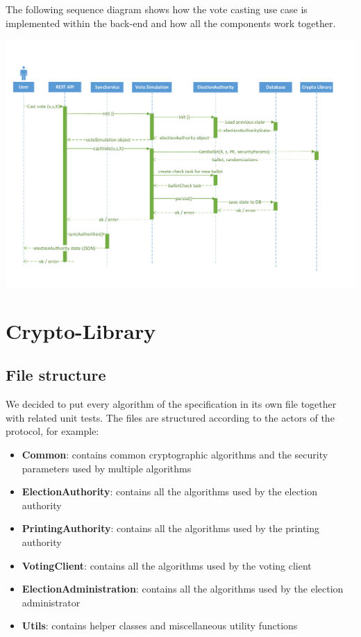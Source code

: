 The following sequence diagram shows how the vote casting use case is implemented within the back-end and how all the components work together.

\begin{center}
\includegraphics[scale=0.62]{assets/votecastingDiagram.pdf}
\label{Vote casting sequence diagram}%
\end{center}

\section{Crypto-Library}

\subsection{File structure}
We decided to put every algorithm of the specification in its own file together with related unit tests. The files are structured according to the actors of the protocol, for example:

\begin{itemize}
	\item \textbf{Common}: contains common cryptographic algorithms and the security parameters used by multiple algorithms
	\item \textbf{ElectionAuthority}: contains all the algorithms used by the election authority
	\item \textbf{PrintingAuthority}: contains all the algorithms used by the printing authority
	\item \textbf{VotingClient}: contains all the algorithms used by the voting client
	\item \textbf{ElectionAdministration}: contains all the algorithms used by the election administrator
	\item \textbf{Utils}: contains helper classes and miscellaneous utility functions
\end{itemize}

